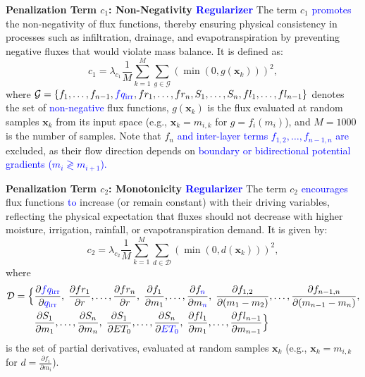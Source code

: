 \documentclass[pdflatex,sn-nature]{sn-jnl}%
\theoremstyle{thmstyleone}%
\theoremstyle{thmstyletwo}%
\theoremstyle{thmstylethree}%
\begin{document}
\textbf{Penalization Term \( c_1 \): Non-Negativity \textcolor{blue}{Regularizer}}
The term \( c_1 \) \textcolor{blue}{promotes} the non-negativity of flux functions, thereby ensuring physical consistency in processes such as infiltration, drainage, and evapotranspiration by preventing negative fluxes that would violate mass balance. It is defined as:
\[
c_1 = \lambda_{c_1} \frac{1}{M} \sum_{k=1}^M \sum_{g \in \mathcal{G}} \left( \min(0, g(\mathbf{x}_k)) \right)^2,
\]
where \( \mathcal{G} = \{ f_1, \dots, f_{n-1}, \textcolor{blue}{fq_{\mathrm{irr}}}, fr_1, \dots, fr_n, S_1, \dots, S_n, fl_1, \dots, fl_{n-1} \} \) denotes the set of \textcolor{blue}{non-negative} flux functions, \( g(\mathbf{x}_k) \) is the flux evaluated at random samples \( \mathbf{x}_k \) from its input space (e.g., \( \mathbf{x}_k = m_{i,k} \) for \( g = f_i(m_i) \)), and \( M = 1000 \) is the number of samples. Note that \( f_n \) \textcolor{blue}{and inter-layer terms \( f_{1,2},\dots,f_{n-1,n} \) are} excluded, as their flow direction depends on \textcolor{blue}{boundary or bidirectional potential gradients ($m_i \gtrless m_{i+1}$).}

\textbf{Penalization Term \( c_2 \): Monotonicity \textcolor{blue}{Regularizer}}
The term \( c_2 \) \textcolor{blue}{encourages} flux functions \textcolor{blue}{to} increase (or remain constant) with their driving variables, reflecting the physical expectation that fluxes should not decrease with higher moisture, irrigation, rainfall, or evapotranspiration demand. It is given by:
\[
c_2 = \lambda_{c_2} \frac{1}{M} \sum_{k=1}^M \sum_{d \in \mathcal{D}} \left( \min(0, d(\mathbf{x}_k)) \right)^2,
\]
where
\[
\begin{aligned}
\mathcal{D} = \Bigl\{ &
\frac{\partial \textcolor{blue}{fq_{\mathrm{irr}}}}{\partial \textcolor{blue}{q_{\mathrm{irr}}}},\;
\frac{\partial fr_1}{\partial r}, \dots, \frac{\partial fr_n}{\partial r},\;
\frac{\partial f_1}{\partial m_1}, \dots, \frac{\partial f_{\textcolor{blue}{n}}}{\partial m_{\textcolor{blue}{n}}},\;
\frac{\partial f_{1,2}}{\partial (m_1 - m_2)}, \dots, \frac{\partial f_{n-1,n}}{\partial (m_{n-1} - m_n)}, \\
& \frac{\partial S_1}{\partial m_1}, \dots, \frac{\partial S_n}{\partial m_n},\;
\frac{\partial S_1}{\partial ET_0}, \dots, \frac{\partial S_n}{\partial \textcolor{blue}{ET_0}},\;
\frac{\partial fl_1}{\partial m_1}, \dots, \frac{\partial fl_{n-1}}{\partial m_{n-1}}
\Bigr\}
\end{aligned}
\]
is the set of partial derivatives, evaluated at random samples \( \mathbf{x}_k \) (e.g., \( \mathbf{x}_k = m_{i,k} \) for \( d = \frac{\partial f_i}{\partial m_i} \)).
\end{document}
